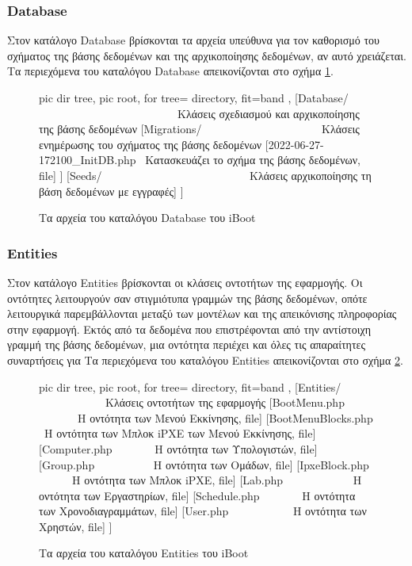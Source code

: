 \subsubsection{Database} \label{ui:app:database}
Στον κατάλογο Database βρίσκονται τα αρχεία υπεύθυνα για τον καθορισμό του σχήματος της βάσης δεδομένων και της αρχικοποίησης δεδομένων, αν αυτό χρειάζεται. Τα περιεχόμενα του καταλόγου Database απεικονίζονται στο σχήμα \ref{dir:iBoot-Database}.

\begin{figure}
	\centering
	{\footnotesize
		\begin{forest}
			pic dir tree,
			pic root,
			for tree={%
				directory,
				fit=band
			},
			[Database/ \ \ \ \ \ \ \ \ \ \ \ \ \ \ \ \ \ \ \ \ \ \ \ \ \ Κλάσεις σχεδιασμού και αρχικοποίησης της βάσης δεδομένων
				[Migrations/ \ \ \ \ \ \ \ \ \ \ \ \ \ \ \ \ \ \ \ \ \ Κλάσεις ενημέρωσης του σχήματος της βάσης δεδομένων
					[2022-06-27-172100\_InitDB.php \ Κατασκευάζει το σχήμα της βάσης δεδομένων, file]
				]
				[Seeds/ \ \ \ \ \ \ \ \ \ \ \ \ \ \ \ \ \ \ \ \ \ \ \ \ \ \ Κλάσεις αρχικοποίησης τη βάση δεδομένων με εγγραφές]
			]
		\end{forest}
	}
	\caption{Τα αρχεία του καταλόγου Database του iBoot}
	\label{dir:iBoot-Database}
\end{figure}

\subsubsection{Entities} \label{ui:app:entities}
Στον κατάλογο Entities βρίσκονται οι κλάσεις οντοτήτων της εφαρμογής. Οι οντότητες λειτουργούν σαν στιγμιότυπα γραμμών της βάσης δεδομένων, οπότε λειτουργικά παρεμβάλλονται μεταξύ των μοντέλων και της απεικόνισης πληροφορίας στην εφαρμογή. Εκτός από τα δεδομένα που επιστρέφονται από την αντίστοιχη γραμμή της βάσης δεδομένων, μια οντότητα περιέχει και όλες τις απαραίτητες συναρτήσεις για Τα περιεχόμενα του καταλόγου Entities απεικονίζονται στο σχήμα \ref{dir:iBoot-Entities}.

\begin{figure}
	\centering
	{\footnotesize
		\begin{forest}
			pic dir tree,
			pic root,
			for tree={%
				directory,
				fit=band
			},
			[Entities/ \ \ \ \ \ \ \ \ \ \ \ \ Κλάσεις οντοτήτων της εφαρμογής
				[BootMenu.php \ \ \ \ \ \ \ Η οντότητα των Μενού Εκκίνησης, file]
				[BootMenuBlocks.php \ Η οντότητα των Μπλοκ iPXE των Μενού Εκκίνησης, file]
				[Computer.php \ \ \ \ \ \ \ Η οντότητα των Υπολογιστών, file]
				[Group.php \ \ \ \ \ \ \ \ \ \ Η οντότητα των Ομάδων, file]
				[IpxeBlock.php \ \ \ \ \ \ Η οντότητα των Μπλοκ iPXE, file]
				[Lab.php \ \ \ \ \ \ \ \ \ \ \ \ Η οντότητα των Εργαστηρίων, file]
				[Schedule.php \ \ \ \ \ \ \ Η οντότητα των Χρονοδιαγραμμάτων, file]
				[User.php \ \ \ \ \ \ \ \ \ \ \ Η οντότητα των Χρηστών, file]
			]
		\end{forest}
	}
	\caption{Τα αρχεία του καταλόγου Entities του iBoot}
	\label{dir:iBoot-Entities}
\end{figure}

